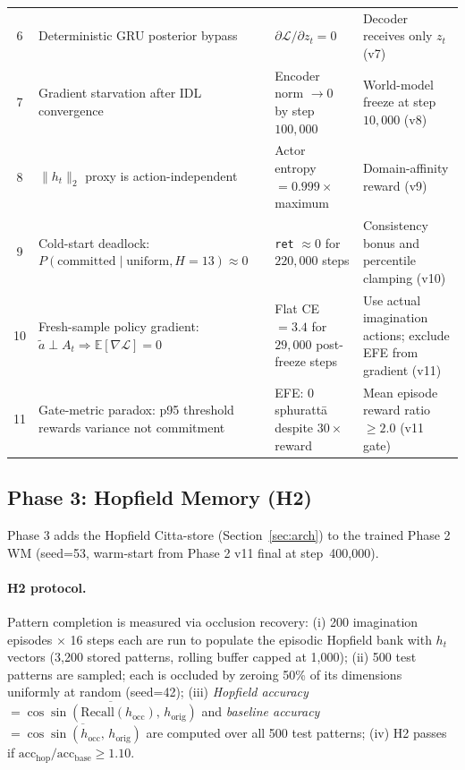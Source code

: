 \documentclass[journal,onecolumn,11pt]{IEEEtran}
\begin{document}
\begin{table}[t]
\begin{tabular}{@{}c p{4.5cm} p{4.7cm} p{4.6cm}@{}}
    6  & Deterministic GRU posterior bypass                                                                         & $\partial\mathcal{L}/\partial z_t = 0$                     & Decoder receives only $z_t$ (v7) \\
    7  & Gradient starvation after IDL convergence                                                                  & Encoder norm $\to 0$ by step $100{,}000$                   & World-model freeze at step $10{,}000$ (v8) \\
    8  & $\|h_t\|_2$ proxy is action-independent                                                                    & Actor entropy $= 0.999\times$ maximum                      & Domain-affinity reward (v9) \\
    9  & Cold-start deadlock: $P(\text{committed} \mid \text{uniform}, H{=}13) \approx 0$                            & \texttt{ret} $\approx 0$ for $220{,}000$ steps              & Consistency bonus and percentile clamping (v10) \\
    10 & Fresh-sample policy gradient: $\tilde{a}\perp A_t \Rightarrow \mathbb{E}[\nabla\mathcal{L}] = 0$            & Flat CE $= 3.4$ for $29{,}000$ post-freeze steps             & Use actual imagination actions; exclude EFE from gradient (v11) \\
    11 & Gate-metric paradox: p95 threshold rewards variance not commitment                                          & EFE: $0$ sphurattā despite $30\times$ reward               & Mean episode reward ratio $\geq 2.0$ (v11 gate) \\
    \bottomrule
  \end{tabular}
\end{table}

\subsection{Phase 3: Hopfield Memory (H2)}

Phase 3 adds the Hopfield Citta-store (Section~\ref{sec:arch}) to the trained
Phase 2 WM (seed=53, warm-start from Phase 2 v11 final at step~400{,}000).

\paragraph{H2 protocol.}
Pattern completion is measured via occlusion recovery:
(i) 200 imagination episodes $\times$ 16 steps each are run to populate the episodic
Hopfield bank with $h_t$ vectors (3{,}200 stored patterns, rolling buffer capped at 1{,}000);
(ii) 500 test patterns are sampled; each is occluded by zeroing 50\% of its dimensions
uniformly at random (seed=42);
(iii) \emph{Hopfield accuracy} $= \overline{\cos\!\sin(\text{Recall}(h_{\text{occ}}),\,h_{\text{orig}})}$
and \emph{baseline accuracy} $= \overline{\cos\!\sin(h_{\text{occ}},\,h_{\text{orig}})}$
are computed over all 500 test patterns;
(iv) H2 passes if $\text{acc}_{\text{hop}} / \text{acc}_{\text{base}} \geq 1.10$.
\end{document}
